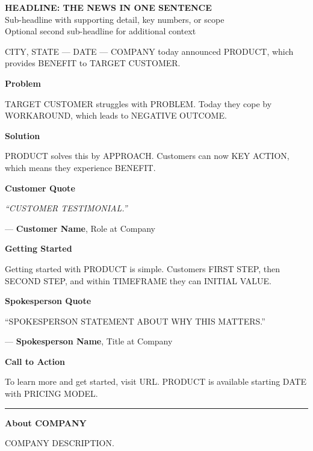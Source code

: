 \documentclass[11pt,letterpaper]{article}
\newcommand{\prsection}[1]{%
  \vspace{1em}%
  {\large\bfseries\color{SectionBlue}#1}%
  \vspace{0.3em}\par%
}
\begin{document}
\begin{center}
  {\LARGE\bfseries\color{SectionBlue} HEADLINE: THE NEWS IN ONE SENTENCE} \\[0.8em]
  {\large\color{AccentGray} Sub-headline with supporting detail, key numbers, or scope} \\[0.3em]
  {\large\color{AccentGray} Optional second sub-headline for additional context}
\end{center}

\vspace{0.5em}

CITY, STATE --- DATE --- COMPANY today announced PRODUCT, which provides
BENEFIT to TARGET CUSTOMER.

\prsection{Problem}

TARGET CUSTOMER struggles with PROBLEM. Today they cope by WORKAROUND,
which leads to NEGATIVE OUTCOME.

\prsection{Solution}

PRODUCT solves this by APPROACH. Customers can now KEY ACTION, which means
they experience BENEFIT.

\prsection{Customer Quote}

\begin{customerquote}
\textit{``CUSTOMER TESTIMONIAL.''}

\raggedleft --- \textbf{Customer Name}, Role at Company
\end{customerquote}

\prsection{Getting Started}

Getting started with PRODUCT is simple. Customers FIRST STEP, then
SECOND STEP, and within TIMEFRAME they can INITIAL VALUE.

\prsection{Spokesperson Quote}

\begin{spokespersonquote}
``SPOKESPERSON STATEMENT ABOUT WHY THIS MATTERS.''

\raggedleft --- \textbf{Spokesperson Name}, Title at Company
\end{spokespersonquote}

\prsection{Call to Action}

To learn more and get started, visit URL. PRODUCT is available starting
DATE with PRICING MODEL.

\vspace{2em}
\noindent\rule{\textwidth}{0.4pt}
\vspace{0.5em}

\noindent\textbf{About COMPANY}

\noindent COMPANY DESCRIPTION.
\end{document}
